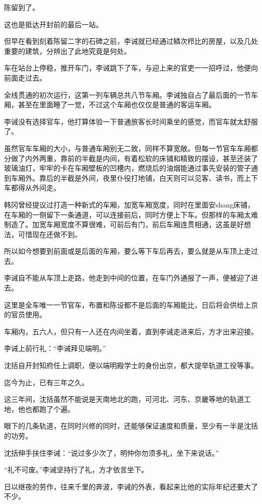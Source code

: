 陈留到了。

这也是抵达开封前的最后一站。

但早在看到刻着陈留二字的石碑之前，李诫就已经通过鳞次栉比的房屋，以及几处重要的建筑，分辨出了此地究竟是何处。

车在站台上停稳，推开车门，李诫跳下了车，与迎上来的官吏一一招呼过，他便向前面走过去。

全线贯通的初次运行，这第一列车辆总共八节车厢。李诫独自占了最后面的一节车厢，甚至在里面睡了一觉，不过这个车厢也仅仅是普通的客运车厢。

李诫没有选择官车，他打算体验一下普通旅客长时间乘坐的感觉，而官车就太舒服了。

虽然官车车厢的大小，与普通车厢别无二致，同样不算宽敞。但每一节官车车厢都分做了内外两重，靠前的半截是内间，有着松软的床铺和精致的摆设，甚至还装了玻璃油灯，牢牢的卡在车厢壁板的凹槽内，燃烧后的油烟能通过事先安装的管子通到车厢外。靠后的半截是外间，夜里仆役打地铺，白天则可以见客、读书，而上下车都得从外间走。

韩冈曾经提议过打造一种新式的车厢，加宽车厢宽度，同时在里面安shang床铺，在车厢的一侧留下一条通道，可以连接前后，同时方便上下车。但那样的车厢太难制造了。加宽车厢宽度不算很难，可前后有门，前后车厢连贯相通，这虽是好想法，可惜现在还做不到。

所以如今想要到前面或是后面的车厢，要么等下车后再去，要么就是从车顶上走过去。

李诫自不能从车顶上走路，他走到中间的位置，在车门外通报了一声，便被迎了进去。

这里是全车唯一一节官车，布置和陈设都不是后面的车厢能比，日后将会供给上京的官员使用。

车厢内，五六人，但只有一人还在内间坐着，直到李诫走进来后，方才出来迎接。

李诫上前行礼：“李诫拜见端明。”

沈括自开封知府任上调职，便以端明殿学士的身份出京，都大提举轨道工役等事。

迄今为止，已有三年之久。

这三年间，沈括虽然不能说是天南地北的跑，可河北、河东、京畿等地的轨道工地，他也都跑了个遍。

眼下的几条轨道，在同时兴修的同时，还能够保证速度和质量，至少有一半是沈括的功劳。

沈括伸手扶住李诫：“说过多少次了，明仲你勿须多礼，坐下来说话。”

“礼不可废。”李诫坚持行了礼，方才依言坐下。

日以继夜的劳作，往来千里的奔波，李诫的外表，看起来比他的实际年纪还要大了不少。

